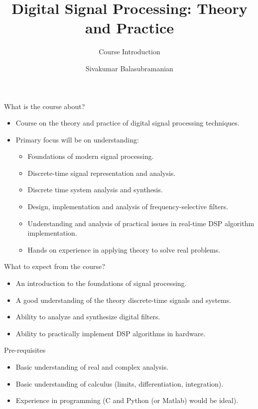 \documentclass{beamer}
\title{Digital Signal Processing: Theory and Practice}
\subtitle{Course Introduction}
\author{Sivakumar Balasubramanian}
\institute[Christian Medical College] %
{
  \inst{}%
  Department of Bioengineering\\
  Christian Medical College, Bagayam\\
  Vellore 632002
}
\date{}
\begin{document}
\begin{frame}
  \titlepage
\end{frame}

\begin{frame}[t]{What is the course about?}
\begin{itemize}
\item Course on the theory and practice of digital signal processing techniques.
\item Primary focus will be on understanding:
\begin{itemize}
\item Foundations of modern signal processing.
\item Discrete-time signal representation and analysis.
\item Discrete time system analysis and synthesis.
\item Design, implementation and analysis of frequency-selective filters.
\item Understanding and analysis of practical issues in real-time DSP algorithm implementation.
\item Hands on experience in applying theory to solve real problems.
\end{itemize}
\end{itemize}
\end{frame}

\begin{frame}[t]{What to expect from the course?}
\begin{itemize}
\item An introduction to the foundations of signal processing.
\item A good understanding of the theory discrete-time signals and systems.
\item Ability to analyze and synthesize digital filters.
\item Ability to practically implement DSP algorithms in hardware.
\end{itemize}
\end{frame}

\begin{frame}[t]{Pre-requisites}
\begin{itemize}
\item Basic understanding of real and complex analysis.
\item Basic understanding of calculus (limits, differentiation, integration).
\item Experience in programming (C and Python (or Matlab) would be ideal).
\end{itemize}
\end{frame}
\end{document}
